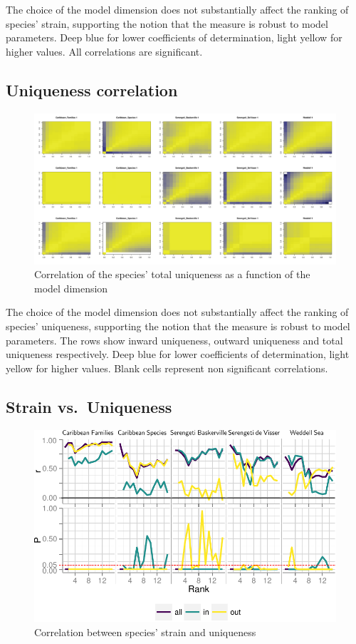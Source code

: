 \documentclass[11pt,article,oneside]{memoir}
\makeatletter
\def\maxwidth{\ifdim\Gin@nat@width>\linewidth\linewidth
\else\Gin@nat@width\fi}
\let\Oldincludegraphics\includegraphics
\renewcommand{\includegraphics}[1]{\Oldincludegraphics[width=\maxwidth]{#1}}
\makeatother
\begin{document}
The choice of the model dimension does not substantially affect the
ranking of species' strain, supporting the notion that the measure is
robust to model parameters. Deep blue for lower coefficients of
determination, light yellow for higher values. All correlations are
significant.

\newpage

\subsection{Uniqueness correlation}\label{uniqueness-correlation}

\begin{figure}[htbp]
\centering
\includegraphics{Images/Md_corr.pdf}
\caption{Correlation of the species' total uniqueness as a function of
the model dimension}
\end{figure}

The choice of the model dimension does not substantially affect the
ranking of species' uniqueness, supporting the notion that the measure
is robust to model parameters. The rows show inward uniqueness, outward
uniqueness and total uniqueness respectively. Deep blue for lower
coefficients of determination, light yellow for higher values. Blank
cells represent non significant correlations.

\newpage

\subsection{Strain vs.~Uniqueness}\label{strain-vs.uniqueness}

\begin{figure}[htbp]
\centering
\includegraphics{Images/indir.pdf}
\caption{Correlation between species' strain and uniqueness}
\end{figure}
\end{document}
